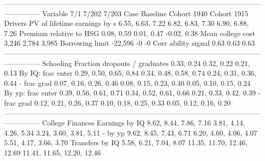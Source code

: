 ---------------------------------------------------------------------------------------------------------------------------
                              Variable                          7/1                       7/202                       7/203
                                  Case                     Baseline                 Cohort 1940                 Cohort 1915
                               Drivers                                                                                     
          PV of lifetime earnings by s             6.55, 6.63, 7.22            6.82, 6.83, 7.30            6.90, 6.88, 7.26
               Premium relative to HSG                   0.08, 0.59                  0.01, 0.47                 -0.02, 0.38
                     Mean college cost                        3,246                       2,784                       3,985
                       Borrowing limit                      -22,596                          -0                          -0
                   Corr ability signal                         0.63                        0.63                        0.63
---------------------------------------------------------------------------------------------------------------------------
                             Schooling                                                                                     
         Fraction dropouts / graduates                   0.33, 0.24                  0.32, 0.22                  0.21, 0.13
                     By IQ: frac enter       0.29, 0.50, 0.65, 0.84      0.34, 0.48, 0.58, 0.74      0.24, 0.31, 0.36, 0.44
                           - frac grad       0.07, 0.16, 0.26, 0.46      0.08, 0.15, 0.23, 0.40      0.05, 0.10, 0.15, 0.24
                     By yp: frac enter       0.39, 0.56, 0.61, 0.71      0.34, 0.52, 0.61, 0.66      0.21, 0.33, 0.42, 0.39
                           - frac grad       0.12, 0.21, 0.26, 0.37      0.10, 0.18, 0.25, 0.33      0.05, 0.12, 0.16, 0.20
---------------------------------------------------------------------------------------------------------------------------
                      College Finances                                                                                     
                        Earnings by IQ       8.62, 8.44, 7.86, 7.16      3.81, 4.14, 4.26, 5.34      3.24, 3.60, 3.81, 5.11
                               - by yp       9.62, 8.45, 7.43, 6.71      6.20, 4.60, 4.06, 4.07      5.51, 4.17, 3.66, 3.70
                       Transfers by IQ       5.58, 6.21, 7.04, 8.07  11.35, 11.70, 12.46, 12.69  11.41, 11.65, 12.20, 12.46
